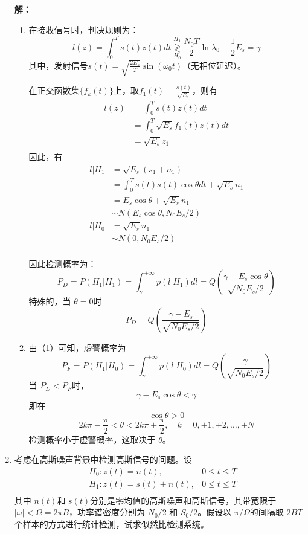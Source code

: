 \documentclass{article}
\begin{document}
\begin{enumerate}[1.]
\textbf{解：}

\begin{enumerate}[(1)]
\item
在接收信号时，判决规则为： \[
	l(z)=\int_0^Ts(t)z(t)dt\mathop{\gtrless}\limits_{H_0}^{H_1}\frac{N_0T}{2}\ln\lambda_0+\frac{1}{2}E_s=\gamma
\]
其中，发射信号$ s(t) = \sqrt{\frac{2E_s}{T}}\sin(\omega_0t)$（无相位延迟）。

在正交函数集$ \{f_k(t)\} $上，取$ f_1(t)=\frac{s(t)}{\sqrt{E_s}} $，则有 \[
	\begin{aligned}
	l(z)& = \int_0^Ts(t)z(t)dt\\
		& = \int_0^T\sqrt{E_s}f_1(t)z(t)dt\\
		& = \sqrt{E_s}z_1\\
	\end{aligned}
\]
因此，有 \[
	\begin{aligned}
	l|H_1 &= \sqrt{E_s}(s_1+n_1)\\
		  &= \int_0^Ts(t)s(t)\cos\theta dt + \sqrt{E_s}n_1\\
		  &= E_s\cos\theta + \sqrt{E_s}n_1\\
		  &\sim N(E_s\cos\theta,N_0E_s/2)\\
	l|H_0 &=\sqrt{E_s}n_1\\
		  &\sim N(0,N_0E_s/2)\\
	\end{aligned}
\]

因此检测概率为： \[
	P_D=P(H_1|H_1)=\int_{\gamma}^{+\infty}p(l|H_1)dl=Q\left(\frac{\gamma-E_s\cos\theta}{\sqrt{N_0E_s/2}}\right)
\]
特殊的，当 $ \theta=0 $时\[
	P_D=Q\left(\frac{\gamma-E_s}{\sqrt{N_0E_s/2}}\right)
\]

\item
由（1）可知，虚警概率为 \[
	P_F=P(H_1|H_0)=\int_{\gamma}^{+\infty}p(l|H_0)dl=Q\left(\frac{\gamma}{\sqrt{N_0E_s/2}}\right)
\]
当 $ P_D<P_F $时， \[
	\gamma-E_s\cos\theta<\gamma
\]
即在 \[
	\cos\theta >0 
\]
$$ 2k\pi -\frac{\pi}{2}<\theta <2k\pi +\frac{\pi}{2},\quad k=0,\pm 1,\pm2,\ldots,\pm N $$
检测概率小于虚警概率，这取决于 $ \theta $。
\end{enumerate}

\item
考虑在高斯噪声背景中检测高斯信号的问题。设 \[
	\begin{aligned}
	&H_0:z(t)=n(t),& 0\le t\le T\\
	&H_1:z(t)=s(t)+n(t),&0\le t\le T\\
	\end{aligned}
\]
其中 $ n(t) $和 $ s(t) $分别是零均值的高斯噪声和高斯信号，其带宽限于 $ |\omega|<\Omega=2\pi B $，功率谱密度分别为 $ N_0/2 $ 和 $ S_0/2 $。假设以 $ \pi/\Omega $的间隔取 $ 2BT $个样本的方式进行统计检测，试求似然比检测系统。


\end{enumerate}
\end{document}
